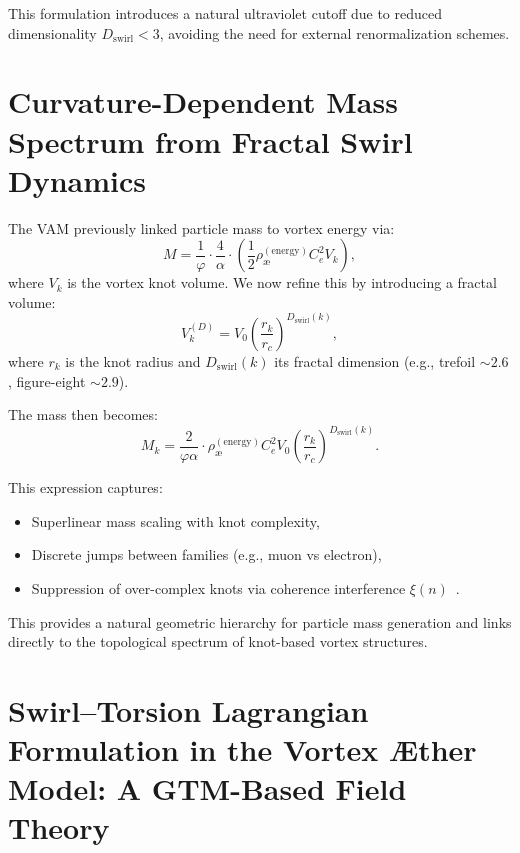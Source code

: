 \documentclass[11pt]{article}
\begin{document}
    This formulation introduces a natural ultraviolet cutoff due to reduced dimensionality \( D_\text{swirl} < 3 \), avoiding the need for external renormalization schemes.

    \section{Curvature-Dependent Mass Spectrum from Fractal Swirl Dynamics}

    The VAM previously linked particle mass to vortex energy via:
    \[
        M = \frac{1}{\varphi} \cdot \frac{4}{\alpha} \cdot \left( \frac{1}{2} \rho_\text{\ae}^{(\text{energy})} C_e^2 V_k \right),
    \]
    where \( V_k \) is the vortex knot volume. We now refine this by introducing a fractal volume:
    \[
        V_k^{(D)} = V_0 \left( \frac{r_k}{r_c} \right)^{D_\text{swirl}(k)},
    \]
    where \( r_k \) is the knot radius and \( D_\text{swirl}(k) \) its fractal dimension (e.g., trefoil \( \sim 2.6 \), figure-eight \( \sim 2.9 \)).

    The mass then becomes:
    \[
        M_k = \frac{2}{\varphi \alpha} \cdot \rho_\text{\ae}^{(\text{energy})} C_e^2 V_0 \left( \frac{r_k}{r_c} \right)^{D_\text{swirl}(k)}.
    \]

    This expression captures:
    \begin{itemize}
        \item Superlinear mass scaling with knot complexity,
        \item Discrete jumps between families (e.g., muon vs electron),
        \item Suppression of over-complex knots via coherence interference \( \xi(n) \)~\cite{vam2024mass}.
    \end{itemize}

    This provides a natural geometric hierarchy for particle mass generation and links directly to the topological spectrum of knot-based vortex structures.



    \section{Swirl--Torsion Lagrangian Formulation in the Vortex \AE ther Model: A GTM-Based Field Theory}
\end{document}
